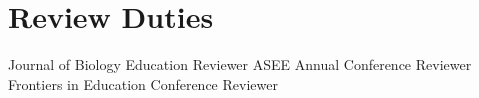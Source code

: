 \section{Review Duties}
\begin{cvtable}
        {Journal of Biology Education}
        {Reviewer}
        {}
        {ASEE Annual Conference}
        {Reviewer}
        {}
        {Frontiers in Education Conference}
        {Reviewer}
        {}
\end{cvtable}
